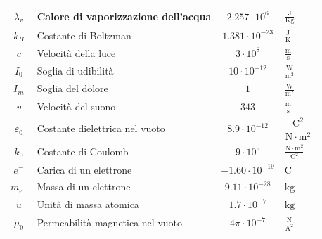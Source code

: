 \documentclass[8pt, a4paper, twocolumn, twoside]{extarticle}
\begin{document}
\begin{center}
\begin{xtabular}{c M{1.8cm} c M{1.5cm}}
    \label{tab:cva} 
    $\lambda_v$ & Calore di vaporizzazione dell'acqua & $2.257\cdot10^6$ &
    $\frac{\text{J}}{\text{Kg}}$\\\midrule
    \label{tab:kB} 
    $k_B$ & Costante di Boltzman & $1.381\cdot10^{-23}$ & 
    $\frac{\text{J}}{\text{K}}$\\ \midrule
    \label{tab:c} 
    $c$ & Velocità della luce & $3\cdot10^8$ & $\frac{\text{m}}{\text{s}}$\\\midrule
    \label{tab:I0} 
    $I_0$ & Soglia di udibilità & $10\cdot10^{-12}$ & 
    $\frac{\text{W}}{\text{m}^2}$\\ \midrule
    \label{tab:Im} 
    $I_m$ & Soglia del dolore & $1$ & $\frac{\text{W}}{\text{m}^2}$\\ \midrule
    \label{tab:vs} 
    $v$ & Velocità del suono & $343$ & $\frac{\text{m}}{\text{s}}$\\ \midrule
    \label{tab:e0} 
    $\varepsilon_0$& Costante dielettrica nel vuoto&$8.9\cdot10^{-12}$&
    $\dfrac{\text{C}^2}{\text{N}\cdot\text{m}^2}$\\ \midrule
    \label{tab:k0}
    $k_0$ & Costante di Coulomb & $9\cdot10^9$ & 
    $\frac{\text{N}\cdot\text{m}^2}{\text{C}^2}$\\ \midrule
    \label{tab:e-} 
    $e^{-}$ & Carica di un elettrone & $-1.60\cdot10^{-19}$ & $\text{C}$\\ \midrule
    \label{tab:me-} 
    $m_{e^{-}}$ & Massa di un elettrone & $9.11\cdot10^{-28}$ & $\text{kg}$\\\midrule
    \label{tab:u} 
    $u$ & Unità di massa atomica & $1.7\cdot10^{-7}$ & $\text{kg}$\\\midrule
    \label{tab:mu0} 
    $\mu_0$ & Permeabilità magnetica nel vuoto & $4\pi\cdot10^{-7}$ & 
    $\frac{\text{N}}{\text{A}^2}$\\
    \midrule
  \end{xtabular}
\end{center}

\newpage
\end{document}
